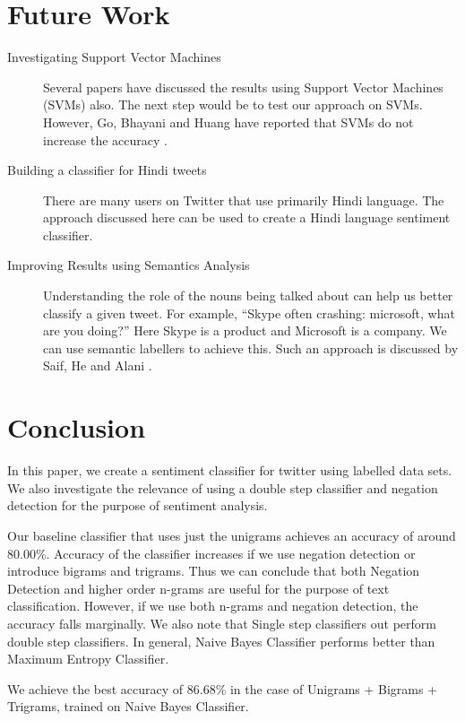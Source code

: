 \section{Future Work}

\begin{description}

\item[Investigating Support Vector Machines] { Several papers have discussed the
results using Support Vector Machines (SVMs) also. The next step would be to
test our approach on SVMs. However, Go, Bhayani and Huang have reported that
SVMs do not increase the accuracy \cite{GBH}. }

\item[Building a classifier for Hindi tweets] { There are many users on Twitter
that use primarily Hindi language. The approach discussed here can be used to
create a Hindi language sentiment classifier. }

\item[Improving Results using Semantics Analysis] { Understanding the role of
the nouns being talked about can help us better classify a given tweet. For
example, ``Skype often crashing: microsoft, what are you doing?'' Here Skype is
a product and Microsoft is a company. We can use semantic labellers to achieve
this. Such an approach is discussed by Saif, He and Alani \cite{SHA}. }


\end{description}

\section{Conclusion}

In this paper, we create a sentiment classifier for twitter using labelled data sets.
We also investigate the relevance of using a double step classifier and negation
detection for the purpose of sentiment analysis.

Our baseline classifier that uses just the unigrams achieves an accuracy of
around 80.00\%. Accuracy of the classifier increases if we use negation
detection or introduce bigrams and trigrams. Thus we can conclude that both
Negation Detection and higher order n-grams are useful for the purpose of text
classification.  However, if we use both n-grams and negation detection, the
accuracy falls marginally. We also note that Single step classifiers out perform
double step classifiers. In general, Naive Bayes Classifier performs better than
Maximum Entropy Classifier.

We achieve the best accuracy of 86.68\% in the case of Unigrams + Bigrams + Trigrams,
trained on Naive Bayes Classifier.

